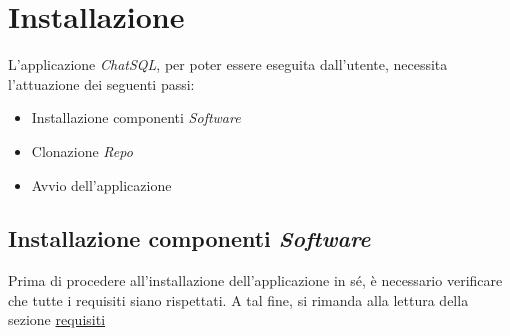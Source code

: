 \documentclass[5pt]{article}
\begin{document}
	\section{Installazione}
		L'applicazione \textit{ChatSQL}, per poter essere eseguita dall'utente, necessita l'attuazione dei seguenti passi:
		\begin{itemize}
			\item Installazione componenti \textit{Software}
			\item Clonazione \textit{Repo}
			\item Avvio dell'applicazione
		\end{itemize}

		\subsection{Installazione componenti \textit{Software}}
			Prima di procedere all'installazione dell'applicazione in sé, è necessario verificare che tutte i requisiti siano rispettati.
			A tal fine, si rimanda alla lettura della sezione \hyperref[sec:requisiti]{requisiti}
			
\end{document}
